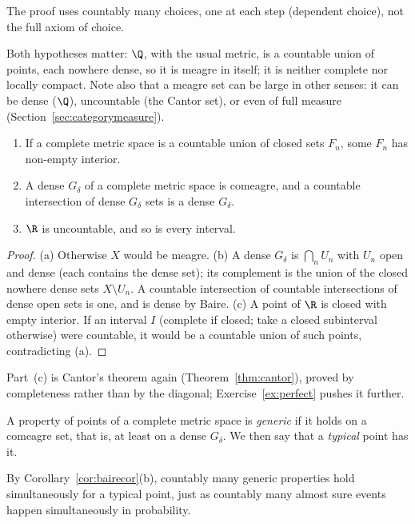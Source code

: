 The proof uses countably many choices, one at each step (dependent choice), not the full axiom of choice.

Both hypotheses matter: $\Q$, with the usual metric, is a countable union of points, each nowhere dense, so it is meagre in itself;
it is neither complete nor locally compact. Note also that a meagre set can be large in other senses: it can be dense ($\Q$),
uncountable (the Cantor set), or even of full measure (Section~\ref{sec:categorymeasure}).

\begin{corollary}\label{cor:bairecor}
\begin{enumerate}[label=(\alph*)]
\item If a complete metric space is a countable union of closed sets $F_n$, some $F_n$ has non-empty interior.
\item A dense $G_\delta$ of a complete metric space is comeagre, and a countable intersection of dense $G_\delta$ sets is a dense $G_\delta$.
\item $\R$ is uncountable, and so is every interval.
\end{enumerate}
\end{corollary}
\begin{proof}
(a) Otherwise $X$ would be meagre. (b) A dense $G_\delta$ is $\bigcap_nU_n$ with $U_n$ open and dense (each contains the dense set); its complement is the union of
the closed nowhere dense sets $X\setminus U_n$. A countable intersection of countable intersections of dense open sets is one, and is dense by Baire.
(c) A point of $\R$ is closed with empty interior. If an interval $I$ (complete if closed; take a closed subinterval otherwise) were countable, it would be a
countable union of such points, contradicting (a).
\end{proof}

Part~(c) is Cantor's theorem again (Theorem~\ref{thm:cantor}), proved by completeness rather than by the diagonal; Exercise~\ref{ex:perfect} pushes it further.

\begin{definition}
A property of points of a complete metric space is \emph{generic} if it holds on a comeagre set, that is, at least on a dense $G_\delta$. We then say that a
\emph{typical} point has it.
\end{definition}

By Corollary~\ref{cor:bairecor}(b), countably many generic properties hold simultaneously for a typical point, just as countably many almost
sure events happen simultaneously in probability.


